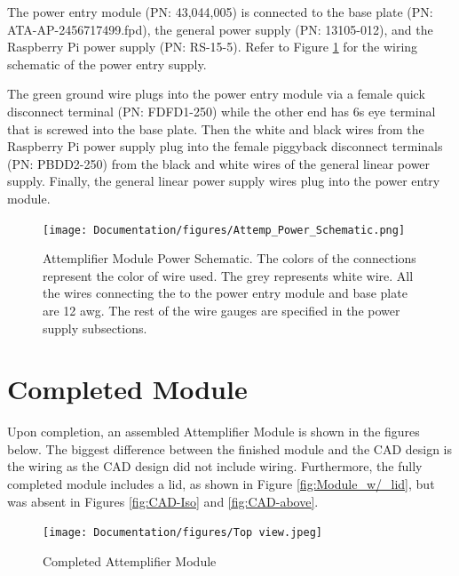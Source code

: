 \documentclass[12pt,a4paper,oneside]{article}
\begin{document}
The power entry module (PN: 43,044,005) is connected to the base plate (PN: ATA-AP-2456717499.fpd), the general power supply (PN: 13105-012), and the Raspberry Pi power supply (PN: RS-15-5). Refer to Figure \ref{fig:Attemp_Power_Schematic} for the wiring schematic of the power entry supply. 

The green ground wire plugs into the power entry module via a
female quick disconnect terminal (PN: FDFD1-250) while the other end has 6s eye terminal that is screwed into the base plate. Then the white and black wires from the Raspberry Pi power supply plug into the female piggyback disconnect terminals (PN: PBDD2-250) from the black and white wires of the general linear power supply. Finally, the general linear power supply wires plug into the power entry module.

\begin{figure}[H]
\centering
\texttt{[image: Documentation/figures/Attemp\_Power\_Schematic.png]}
\caption{Attemplifier Module Power Schematic. The colors of the connections represent the color of wire used. The grey represents white wire. All the wires connecting the to the power entry module and base plate are 12 awg. The rest of the wire gauges are specified  in the power supply subsections.}
\label{fig:Attemp_Power_Schematic}
\end{figure}

\section{Completed Module}
\label{sec:7}

Upon completion, an assembled Attemplifier Module is shown in the figures below. The biggest difference between the finished module and the CAD design is the wiring as the CAD design did not include wiring. Furthermore, the fully completed module includes a lid, as shown in Figure \ref{fig:Module_w/_lid}, but was absent in Figures \ref{fig:CAD-Iso} and \ref{fig:CAD-above}.


\begin{figure}[H]
\centering
\texttt{[image: Documentation/figures/Top view.jpeg]}
\caption{Completed Attemplifier Module}
\label{fig:Module_above}
\end{figure}
\end{document}
